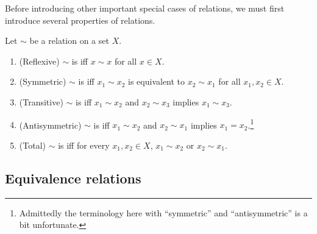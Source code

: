 \horizontalrule

Before introducing other important special cases of relations, we must first introduce several properties of relations.
\begin{dfn}{}{}
Let $\sim$ be a relation on a set $X$.
\begin{enumerate}
\item (Reflexive) $\sim$ is  iff $x\sim x$ for all $x\in X$.
\item (Symmetric) $\sim$ is  iff $x_1\sim x_2$ is equivalent to $x_2\sim x_1$ for all $x_1,x_2\in X$.
\item (Transitive) $\sim$ is  iff $x_1\sim x_2$ and $x_2\sim x_3$ implies $x_1\sim x_3$.
\item (Antisymmetric) $\sim$ is  iff $x_1\sim x_2$ and $x_2\sim x_1$ implies $x_1=x_2$.\footnote{Admittedly the terminology here with ``symmetric'' and ``antisymmetric'' is a bit unfortunate.}
\item (Total) $\sim$ is  iff for every $x_1,x_2\in X$, $x_1\sim x_2$ or $x_2\sim x_1$.
\end{enumerate}
\end{dfn}

\subsection{Equivalence relations}

